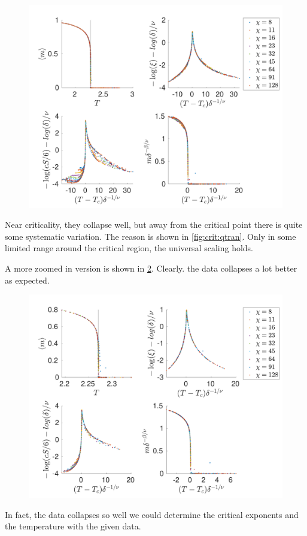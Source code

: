 \begin{figure}
    \center
    \includegraphics[width=\textwidth]{Figuren/phasediag/g0/Full.pdf}
    \caption{  }
    \label{fig:phase:g0:full}
\end{figure}


Near criticality, they collapse well, but away from the critical point there is quite some systematic variation. The reason is shown in \cref{fig:crit:qtran}. Only in some limited range around the critical region, the universal scaling holds.

A more zoomed in version is shown in \cref{fig:phase:g0:zoomed}. Clearly. the data collapses a lot better as expected.
\begin{figure}
    \center
    \includegraphics[width=\textwidth]{Figuren/phasediag/g0/zoomed.pdf}
    \caption{  }
    \label{fig:phase:g0:zoomed}
\end{figure}
In fact, the data collapses so well we could determine the critical exponents and the temperature with the given data.

